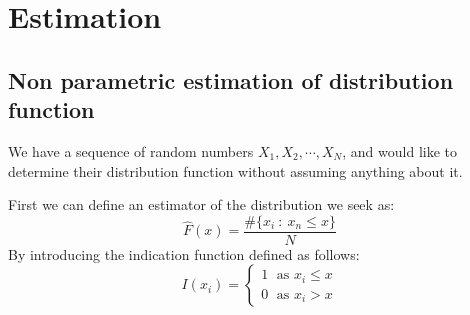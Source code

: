 \chapter{Estimation}
\section{Non parametric estimation of distribution function}
We have a sequence of random numbers $X_1,X_2,\cdots ,X_N$, and would like to determine their distribution function without assuming anything about it.

First we can define an estimator of the distribution we seek as:
\begin{equation}
    \hat{F}(x) = \frac{	\#\{x_i\::\:x_n\le x\}}{N}
\end{equation}
By introducing the indication function defined as follows:
\begin{equation}
    I(x_i) = \begin{cases}
        1\; \text{ as } x_i \le x\\
        0\; \text{ as } x_i > x
    \end{cases}
\end{equation}

